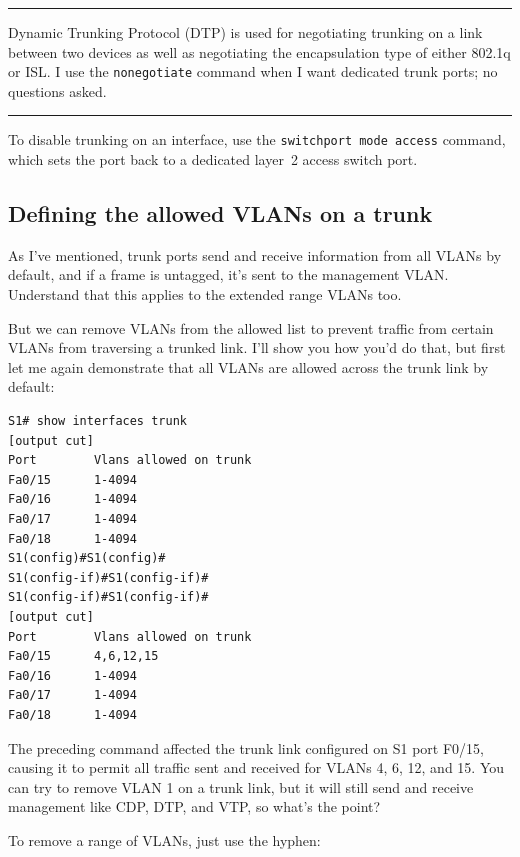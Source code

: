 \documentclass[b5paper,11pt]{memoir}
\begin{document}
\begin{center}\rule{0.5\linewidth}{0.5pt}\end{center}

Dynamic Trunking Protocol (DTP) is used
for negotiating trunking on a link between two devices as well as
negotiating the encapsulation type of either 802.1q or ISL. I use the
\texttt{nonegotiate} command when I want dedicated trunk ports; no
questions asked.

\begin{center}\rule{0.5\linewidth}{0.5pt}\end{center}

To disable trunking on an interface, use the \texttt{switchport\ mode\ access} command,
which sets the port back to a dedicated layer~2 access switch port.




\subsection{Defining the allowed VLANs on a trunk}

As I've mentioned, trunk ports send and receive information from all
VLANs by default, and if a frame is untagged, it's sent to the
management VLAN. Understand that this applies to the extended range
VLANs too.

But we can remove VLANs from the allowed list to prevent traffic from
certain VLANs from traversing a trunked link. I'll show you how you'd do
that, but first let me again demonstrate that all VLANs are allowed
across the trunk link by default:

\begin{verbatim}
S1# show interfaces trunk
[output cut]
Port        Vlans allowed on trunk
Fa0/15      1-4094
Fa0/16      1-4094
Fa0/17      1-4094
Fa0/18      1-4094
S1(config)#S1(config)#
S1(config-if)#S1(config-if)#
S1(config-if)#S1(config-if)#
[output cut]
Port        Vlans allowed on trunk
Fa0/15      4,6,12,15
Fa0/16      1-4094
Fa0/17      1-4094
Fa0/18      1-4094
\end{verbatim}

The preceding command affected the trunk link configured on S1 port
F0/15, causing it to permit all traffic sent and received for VLANs 4,
6, 12, and 15. You can try to remove VLAN 1 on a trunk link, but it will
still send and receive management like CDP, DTP, and VTP, so what's the
point?

To remove a range of VLANs, just use the hyphen:
\end{document}
